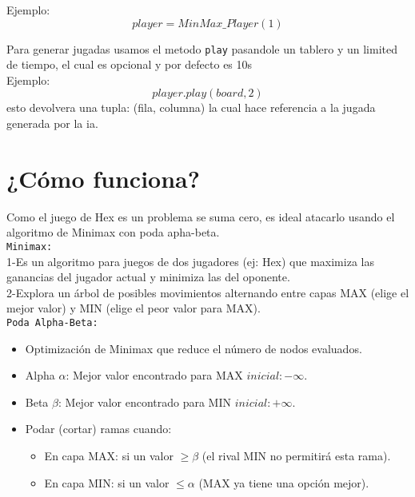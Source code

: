 \documentclass[11pt]{article}
\begin{document}
Ejemplo: \[ player = MinMax\_Player(1)\]

Para generar jugadas usamos el metodo \texttt{play} pasandole un tablero y un limited de tiempo, el cual es opcional y por defecto es 10s\\

Ejemplo: \[ player.play(board, 2)\] esto devolvera una tupla: (fila, columna) la cual hace referencia a la jugada generada por la ia.


\section{¿Cómo funciona?}

Como el juego de Hex es un problema se suma cero, es ideal atacarlo usando el algoritmo de Minimax con poda apha-beta.\\
\texttt{Minimax:}\\

    1-Es un algoritmo para juegos de dos jugadores (ej: Hex) que maximiza las ganancias del jugador actual y minimiza las del oponente.\\

    2-Explora un árbol de posibles movimientos alternando entre capas MAX (elige el mejor valor) y MIN (elige el peor valor para MAX).\\
\texttt{Poda Alpha-Beta:}\\
    \begin{itemize}
    \item Optimización de Minimax que reduce el número de nodos evaluados.\\
    \item Alpha \(\alpha\): Mejor valor encontrado para MAX \(inicial: -\infty\).\\

    \item Beta \(\beta\): Mejor valor encontrado para MIN \(inicial: +\infty\).\\

    \item Podar (cortar) ramas cuando:\\
        \begin{itemize}
            \item En capa MAX: si un valor \(\geq \beta\) (el rival MIN no permitirá esta rama).\\
            \item En capa MIN: si un valor \(\leq \alpha\) (MAX ya tiene una opción mejor).\\
        \end{itemize}

    
    \end{itemize}
\end{document}
